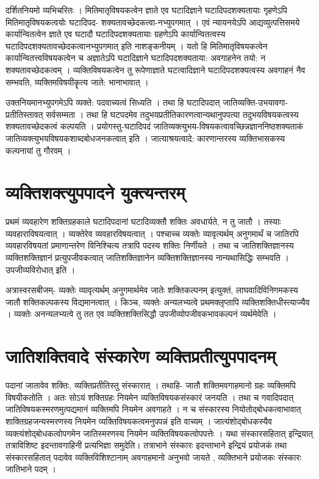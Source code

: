 {दर्शितनियमो व्यभिचरितः । मितिमातृविषयकत्वेन ज्ञाते एव घटादिज्ञाने घटादिपदशक्यतायाः गृहणेऽपि मितिमातृविषयकत्वयोः घटादिपद- शक्यतावच्छेदकत्वा-नभ्युपगमात् । एवं न्यायनयेऽपि आद्यव्युत्पत्तिसमये कार्यान्वितत्वेन ज्ञाते एव घटादौ घटादिपदशक्यतायाः ग्रहणेऽपि कार्यान्वितत्वस्य घटादिपदशक्यतावच्छेदकत्वानभ्युपगमात् इति नाशङ्कनीयम् । यतो हि मितिमातृविषयकत्वेन कार्यान्वितत्त्वविषयकत्वेन च अज्ञातेऽपि घटादिज्ञाने घटादिपदशक्यताया: अवगाहनेन तयो: न शक्यतावच्छेदकत्वम् । व्यक्तिविषयकत्वेन तु रूपेणाज्ञाते घटत्वादिज्ञाने घटादिपदशक्यत्वस्य अवगाहनं नैव सम्भवति, व्यक्तिमविषयीकॄत्य जाते: भानाभावात् । 

उक्तनियमानभ्युपगमेऽपि व्यक्ते: पदवाच्यत्वं सिध्यति । तथा हि घटादिपदात् जातिव्यक्ति-उभयावगा-प्रतीतिस्तावत् सर्वसम्मता । तथा हि घटपदमेव तदुभयप्रतीतिकारणत्वान्यथानुपपत्या तदुभयविषयकत्वस्य शक्यतावच्छेदकत्वं कल्पयति । प्रयोगस्तु-घटादिपदं जातिव्यक्त्युभय-विषयकत्वावच्छिन्नज्ञाननिष्ठशक्यताकं जातिव्यक्त्युभयविषयकशाब्दबोधजनकत्वात् इति । जात्याश्रयत्वादे: कारणान्तरस्य व्यक्तिभासकस्य कल्पनायां तु गौरवम् । 

\section*{व्यक्तिशक्त्युपपादने युक्त्यन्तरम्} 

प्रथमं व्यवहारेण शक्तिग्रहकाले घटादिपदानां घटादिव्यक्तौ शक्तिः अवधार्यते, न तु जातौ । तस्याः व्यवहाराविषयत्वात् । व्यक्तेरेव व्यवहारविषयत्वात् । पश्चाच्च व्यक्तेः व्यावृत्यर्थम् अनुगमार्थं च जातिरपि व्यवहारविषयतां प्रमाणान्तरेण विनिश्चित्य तत्रापि पदस्य शक्तिः निर्णीयते । तथा च जातिशक्तिज्ञानस्य व्यक्तिशक्तिज्ञानं प्रत्युपजीवकत्वात् जातिशक्तिज्ञानेन व्यक्तिशक्तिज्ञानस्य नान्यथासिद्धिः सम्भवति । उपजीव्यविरोधात् इति । 

अत्रास्वरसबीजम्- व्यक्तेः व्यावृत्यर्थम् अनुगमार्थमेव जातेः शक्तिकल्पनम् इत्युक्तं, लाघवादिविनिगमकस्य जातौ शक्तिकल्पकस्य विद्यमानत्वात् । किञ्च, व्यक्तेः अन्यलभ्यत्वे प्रथमक्लृप्तापि व्यक्तिशक्तिधीस्त्याज्यैव । व्यक्तेः अनन्यलभ्यत्वे तु तत एव व्यक्तिशक्तिसिद्धौ उपजीव्योपजीवकभावकल्पनं व्यर्थमेवेति । 

\section*{जातिशक्तिवादे संस्कारेण व्यक्तिप्रतीत्युपपादनम्}

पदानां जातावेव शक्तिः, व्यक्तिप्रतीतिस्तु संस्कारात् । तथाहि- जातौ शक्तिमवगाहमानो ग्रहः व्यक्तिमपि विषयीकतोति । अतः सोऽयं शक्तिग्रहः नियमेन व्यक्तिविषयकसंस्कारं जनयति । तथा च गवादिपदात् जातिविषयकस्मरणमुत्पद्यमानं व्यक्तिमपि नियमेन अवगाहते । न च संस्कारस्य नियोतोद्बोधकत्वाभावात् शाक्तिग्रहजन्यस्मरणस्य नियमेन व्यक्तिविषयकत्वमनुपपन्नं इति वाच्यम् । जात्यंशोद्बोधकस्यैव व्यक्त्यंशोद्बोधकत्वोपगमेन जातिस्मरणस्य नियमेन व्यक्तिविषयकत्वोपपत्तेः । यथा संस्कारसहितात् इन्द्रियात् तत्राविशिष्ट इदन्तावगाहिनी प्रत्यभिज्ञा  समुदेति। तत्राभाने संस्कारः इदन्ताभाने इन्द्रियं प्रयोजकं तथा संस्कारसहितात् पदावेव व्यक्तिविशिश्टानाम्  अवगाहमानो अनुभवो जायते , व्यक्तिभाने प्रयोजकः संस्कारः जातिभाने पदम् ।

}
